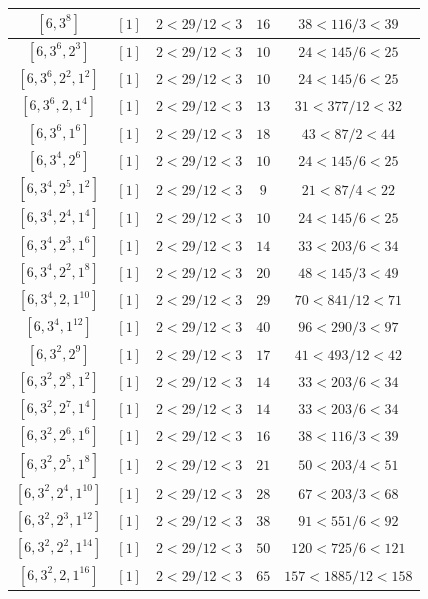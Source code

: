 \documentclass{article}%
\begin{document}
\begin{center}
\begin{longtable}{||c|c|c|c|c||}
$[6, 3^{8}]$ & $[1]$ & $2 < 29/12 < 3$ & $16$ & $38 < 116/3 < 39$ \\ \hline 
$[6, 3^{6}, 2^{3}]$ & $[1]$ & $2 < 29/12 < 3$ & $10$ & $24 < 145/6 < 25$ \\ \hline 
$[6, 3^{6}, 2^{2}, 1^{2}]$ & $[1]$ & $2 < 29/12 < 3$ & $10$ & $24 < 145/6 < 25$ \\ \hline 
$[6, 3^{6}, 2, 1^{4}]$ & $[1]$ & $2 < 29/12 < 3$ & $13$ & $31 < 377/12 < 32$ \\ \hline 
$[6, 3^{6}, 1^{6}]$ & $[1]$ & $2 < 29/12 < 3$ & $18$ & $43 < 87/2 < 44$ \\ \hline 
$[6, 3^{4}, 2^{6}]$ & $[1]$ & $2 < 29/12 < 3$ & $10$ & $24 < 145/6 < 25$ \\ \hline 
$[6, 3^{4}, 2^{5}, 1^{2}]$ & $[1]$ & $2 < 29/12 < 3$ & $9$ & $21 < 87/4 < 22$ \\ \hline 
$[6, 3^{4}, 2^{4}, 1^{4}]$ & $[1]$ & $2 < 29/12 < 3$ & $10$ & $24 < 145/6 < 25$ \\ \hline 
$[6, 3^{4}, 2^{3}, 1^{6}]$ & $[1]$ & $2 < 29/12 < 3$ & $14$ & $33 < 203/6 < 34$ \\ \hline 
$[6, 3^{4}, 2^{2}, 1^{8}]$ & $[1]$ & $2 < 29/12 < 3$ & $20$ & $48 < 145/3 < 49$ \\ \hline 
$[6, 3^{4}, 2, 1^{10}]$ & $[1]$ & $2 < 29/12 < 3$ & $29$ & $70 < 841/12 < 71$ \\ \hline 
$[6, 3^{4}, 1^{12}]$ & $[1]$ & $2 < 29/12 < 3$ & $40$ & $96 < 290/3 < 97$ \\ \hline 
$[6, 3^{2}, 2^{9}]$ & $[1]$ & $2 < 29/12 < 3$ & $17$ & $41 < 493/12 < 42$ \\ \hline 
$[6, 3^{2}, 2^{8}, 1^{2}]$ & $[1]$ & $2 < 29/12 < 3$ & $14$ & $33 < 203/6 < 34$ \\ \hline 
$[6, 3^{2}, 2^{7}, 1^{4}]$ & $[1]$ & $2 < 29/12 < 3$ & $14$ & $33 < 203/6 < 34$ \\ \hline 
$[6, 3^{2}, 2^{6}, 1^{6}]$ & $[1]$ & $2 < 29/12 < 3$ & $16$ & $38 < 116/3 < 39$ \\ \hline 
$[6, 3^{2}, 2^{5}, 1^{8}]$ & $[1]$ & $2 < 29/12 < 3$ & $21$ & $50 < 203/4 < 51$ \\ \hline 
$[6, 3^{2}, 2^{4}, 1^{10}]$ & $[1]$ & $2 < 29/12 < 3$ & $28$ & $67 < 203/3 < 68$ \\ \hline 
$[6, 3^{2}, 2^{3}, 1^{12}]$ & $[1]$ & $2 < 29/12 < 3$ & $38$ & $91 < 551/6 < 92$ \\ \hline 
$[6, 3^{2}, 2^{2}, 1^{14}]$ & $[1]$ & $2 < 29/12 < 3$ & $50$ & $120 < 725/6 < 121$ \\ \hline 
$[6, 3^{2}, 2, 1^{16}]$ & $[1]$ & $2 < 29/12 < 3$ & $65$ & $157 < 1885/12 < 158$ \\ \hline 

\end{longtable}
\end{center}
\end{document}
